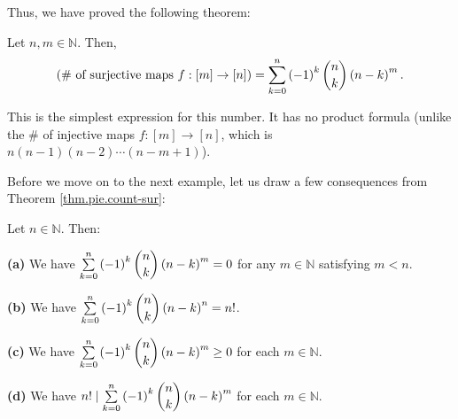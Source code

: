Thus, we have proved the following theorem:

\begin{theorem}
\label{thm.pie.count-sur}Let $n,m\in\mathbb{N}$. Then,%
\[
\left(  \text{\# of surjective maps }f:\left[  m\right]  \rightarrow\left[
n\right]  \right)  =\sum\limits_{k=0}^{n}\left(  -1\right)  ^{k}\dbinom{n}%
{k}\left(  n-k\right)  ^{m}.
\]

\end{theorem}

This is the simplest expression for this number. It has no product formula
(unlike the \# of injective maps $f:\left[  m\right]  \rightarrow\left[
n\right]  $, which is $n\left(  n-1\right)  \left(  n-2\right)  \cdots\left(
n-m+1\right)  $).

Before we move on to the next example, let us draw a few consequences from
Theorem \ref{thm.pie.count-sur}:

\begin{corollary}
\label{cor.pie.count-sur.cors}Let $n\in\mathbb{N}$. Then: \medskip

\textbf{(a)} We have $\sum\limits_{k=0}^{n}\left(  -1\right)  ^{k}\dbinom
{n}{k}\left(  n-k\right)  ^{m}=0$ for any $m\in\mathbb{N}$ satisfying $m<n$.
\medskip

\textbf{(b)} We have $\sum\limits_{k=0}^{n}\left(  -1\right)  ^{k}\dbinom
{n}{k}\left(  n-k\right)  ^{n}=n!$. \medskip

\textbf{(c)} We have $\sum\limits_{k=0}^{n}\left(  -1\right)  ^{k}\dbinom
{n}{k}\left(  n-k\right)  ^{m}\geq0$ for each $m\in\mathbb{N}$. \medskip

\textbf{(d)} We have $n!\mid\sum\limits_{k=0}^{n}\left(  -1\right)
^{k}\dbinom{n}{k}\left(  n-k\right)  ^{m}$ for each $m\in\mathbb{N}$.
\end{corollary}

